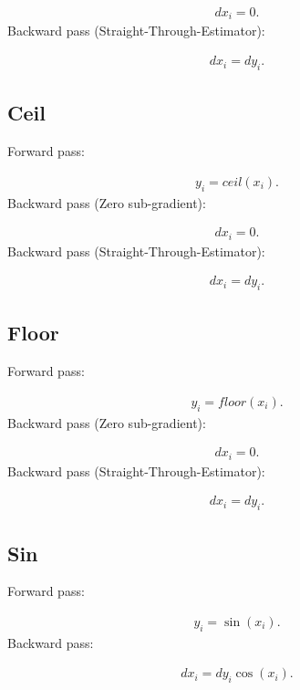 \documentclass{article}
\begin{document}
\begin{eqnarray}
  dx_i = 0.
\end{eqnarray}
%
Backward pass (Straight-Through-Estimator):

\begin{eqnarray}
  dx_i = dy_i. 
\end{eqnarray}


\subsection{Ceil}

Forward pass:

\begin{eqnarray}
  y_i = ceil(x_i).  
\end{eqnarray}
%
Backward pass (Zero sub-gradient):

\begin{eqnarray}
  dx_i = 0.
\end{eqnarray}
%
Backward pass (Straight-Through-Estimator):

\begin{eqnarray}
  dx_i = dy_i. 
\end{eqnarray}

\subsection{Floor}

Forward pass:

\begin{eqnarray}
  y_i = floor(x_i).
\end{eqnarray}
%
Backward pass (Zero sub-gradient):

\begin{eqnarray}
  dx_i = 0.
\end{eqnarray}
%
Backward pass (Straight-Through-Estimator):

\begin{eqnarray}
  dx_i = dy_i. 
\end{eqnarray}

\subsection{Sin}

Forward pass:

\begin{eqnarray}
  y_i = \sin (x_i).    
\end{eqnarray}
%
Backward pass:

\begin{eqnarray}
  dx_i = dy_i \cos(x_i).
\end{eqnarray}
\end{document}
